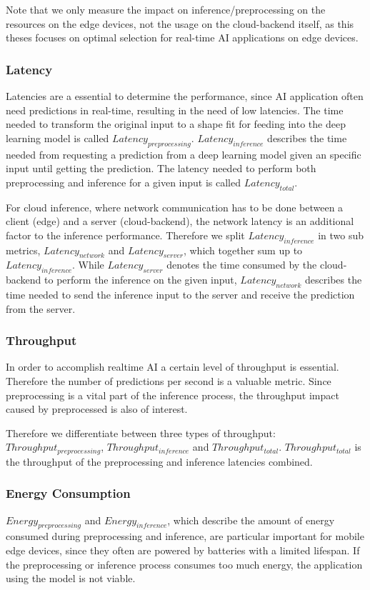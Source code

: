 Note that we only measure the impact on inference/preprocessing on the resources on the edge devices, not the usage on the cloud-backend itself, as this theses focuses on optimal selection for real-time AI applications on edge devices.
\subsubsection{Latency}
Latencies are a essential to determine the performance, since AI application often need predictions in real-time, resulting in the need of low latencies.
The time needed to transform the original input to a shape fit for feeding into the deep learning model is called $Latency_{preprocessing}$.
$Latency_{inference}$ describes the time needed from requesting a prediction from a deep learning model given an specific input until getting the prediction.
The latency needed to perform both preprocessing and inference for a given input is called $Latency_{total}$.

For cloud inference, where network communication has to be done between a client (edge) and a server (cloud-backend), the network latency is an additional factor to the inference performance.
Therefore we split $Latency_{inference}$ in two sub metrics, $Latency_{network}$ and $Latency_{server}$, which together sum up to $Latency_{inference}$.
While $Latency_{server}$ denotes the time consumed by the cloud-backend to perform the inference on the given input, $Latency_{network}$ describes the time needed to send the inference input to the server and receive the prediction from the server.
\subsubsection{Throughput}
In order to accomplish realtime AI a certain level of throughput is essential. Therefore the number of predictions per second is a valuable metric. 
Since preprocessing is a vital part of the inference process, the throughput impact caused by preprocessed is also of interest.

Therefore we differentiate between three types of throughput: $Throughput_{preprocessing}$, $Throughput_{inference}$ and $Throughput_{total}$.
$Throughput_{total}$ is the throughput of the preprocessing and inference latencies combined.



\subsubsection{Energy Consumption}
$Energy_{preprocessing}$ and $Energy_{inference}$, which describe the amount of energy consumed during preprocessing and inference, are particular important for mobile edge devices, since they often are powered by batteries with a limited lifespan. If the preprocessing or inference process consumes too much energy, the application using the model is not viable.


